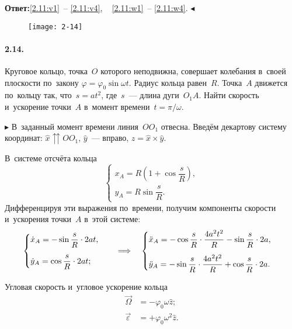 \documentclass{weekly}
\begin{document}
\textbf{Ответ:}\quad \eqref{2.11:v1}~-- \eqref{2.11:v4}, ~
\eqref{2.11:w1}~-- \eqref{2.11:w4}.
\hfill $\blacktriangleleft$


\begin{wrapfigure}[6]{r}{4cm}\vspace{-5.5mm}
    \texttt{[image: 2-14]}
\end{wrapfigure}
\paragraph{2.14.} Круговое кольцо, точка~$O$ которого неподвижна,
совершает колебания в~своей плоскости по~закону
$\varphi = \varphi_0 \sin\omega t$. Радиус кольца равен~$R$.
Точка~$A$ движется по~кольцу так, что~$s = at^2$, где~$s$~---
длина дуги~$O_1 A$. Найти скорость и~ускорение точки~$A$
в~момент времени~$t = \pi/\omega$.

$\blacktriangleright$ В~заданный момент времени линия~$OO_1$ отвесна.
Введём декартову систему координат: $\hat x \upuparrows OO_1$,
$\hat y$~--- вправо, $\hat z = \hat x \times \hat y$.

В~системе отсчёта кольца
\begin{equation}
\begin{cases}
    x_A = R \left( 1 + \cos\dfrac{s}{R} \right), \\[2mm]
    y_A = R \sin\dfrac{s}{R}.
\end{cases}
\end{equation}
Дифференцируя эти выражения по~времени, получим
компоненты скорости и~ускорения точки~$A$ в~этой системе:
\begin{equation}
\begin{cases}
    \dot x_A = -\sin\dfrac{s}{R} \cdot 2at, \\[4mm]
    \dot y_A = \cos\dfrac{s}{R} \cdot 2at;
\end{cases} \quad \Longrightarrow \quad
\begin{cases}
    \ddot x_A = -\cos\dfrac{s}{R} \cdot \dfrac{4a^2 t^2}{R} -
            \sin\dfrac{s}{R} \cdot 2a, \\[4mm]
    \ddot y_A = -\sin\dfrac{s}{R} \cdot \dfrac{4a^2 t^2}{R} +
            \cos\dfrac{s}{R} \cdot 2a.
\end{cases}
\end{equation}

Угловая скорость и~угловое ускорение кольца
\begin{align}
    \vec\Omega &= -\varphi_0 \omega \hat z; \\
    \vec\varepsilon &= +\varphi_0 \omega^2 \hat z.
\end{align}
\end{document}

